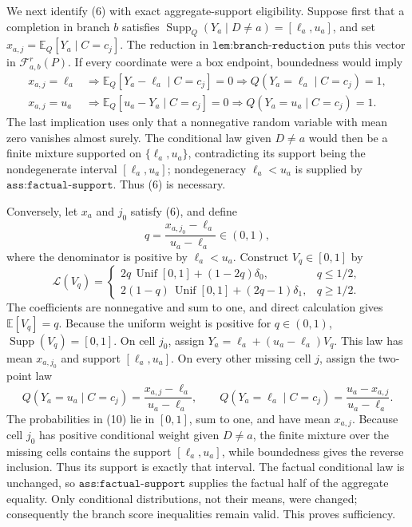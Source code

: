 We next identify (6) with exact aggregate-support eligibility.  Suppose first that a completion in branch \(b\) satisfies
\(\operatorname{Supp}_Q(Y_a\mid D\ne a)=[\ell_a,u_a]\), and set \(x_{a,j}=\mathbb E_Q[Y_a\mid C=c_j]\).  The reduction in \(\texttt{lem:branch-reduction}\) puts this vector in \(\mathcal F_{a,b}^r(P)\).  If every coordinate were a box endpoint, boundedness would imply
\[
 \begin{aligned}
 x_{a,j}=\ell_a
 &\Longrightarrow
 \mathbb E_Q[Y_a-\ell_a\mid C=c_j]=0
 \Longrightarrow Q(Y_a=\ell_a\mid C=c_j)=1,\\
 x_{a,j}=u_a
 &\Longrightarrow
 \mathbb E_Q[u_a-Y_a\mid C=c_j]=0
 \Longrightarrow Q(Y_a=u_a\mid C=c_j)=1.
 \end{aligned}                                                               \tag{7}
\]
The last implication uses only that a nonnegative random variable with mean zero vanishes almost surely.  The conditional law given \(D\ne a\) would then be a finite mixture supported on \(\{\ell_a,u_a\}\), contradicting its support being the nondegenerate interval \([\ell_a,u_a]\); nondegeneracy \(\ell_a<u_a\) is supplied by \(\texttt{ass:factual-support}\).  Thus (6) is necessary.

Conversely, let \(x_a\) and \(j_0\) satisfy (6), and define
\[
 q=\frac{x_{a,j_0}-\ell_a}{u_a-\ell_a}\in(0,1),                              \tag{8}
\]
where the denominator is positive by \(\ell_a<u_a\).  Construct \(V_q\in[0,1]\) by
\[
 \mathcal L(V_q)=
 \begin{cases}
 2q\,\operatorname{Unif}[0,1]+(1-2q)\delta_0,&q\le1/2,\\
 2(1-q)\,\operatorname{Unif}[0,1]+(2q-1)\delta_1,&q\ge1/2.
 \end{cases}                                                                  \tag{9}
\]
The coefficients are nonnegative and sum to one, and direct calculation gives \(\mathbb E[V_q]=q\).  Because the uniform weight is positive for \(q\in(0,1)\), \(\operatorname{Supp}(V_q)=[0,1]\).  On cell \(j_0\), assign
\(Y_a=\ell_a+(u_a-\ell_a)V_q\).  This law has mean \(x_{a,j_0}\) and support \([\ell_a,u_a]\).  On every other missing cell \(j\), assign the two-point law
\[
 Q(Y_a=u_a\mid C=c_j)=\frac{x_{a,j}-\ell_a}{u_a-\ell_a},
 \qquad
 Q(Y_a=\ell_a\mid C=c_j)=\frac{u_a-x_{a,j}}{u_a-\ell_a}.                    \tag{10}
\]
The probabilities in (10) lie in \([0,1]\), sum to one, and have mean \(x_{a,j}\).  Because cell \(j_0\) has positive conditional weight given \(D\ne a\), the finite mixture over the missing cells contains the support \([\ell_a,u_a]\), while boundedness gives the reverse inclusion.  Thus its support is exactly that interval.  The factual conditional law is unchanged, so \(\texttt{ass:factual-support}\) supplies the factual half of the aggregate equality.  Only conditional distributions, not their means, were changed; consequently the branch score inequalities remain valid.  This proves sufficiency.

